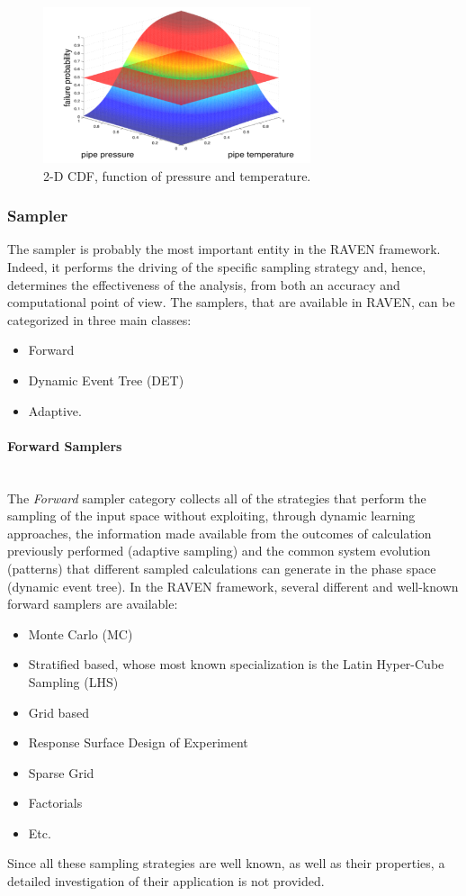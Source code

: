 \begin{figure}
  \centering
  \includegraphics[width=0.7\textwidth]  {pics/NDimensionalDistributionExample.png}
  \caption{2-D CDF, function of pressure and temperature.}
  \label{fig:NDDistributionExample}
\end{figure}

\subsubsection{Sampler}
\label{susub:OverviewSamplers}
The sampler is probably the most important entity in the RAVEN framework. Indeed, it performs the driving of the specific sampling strategy and, hence, determines the effectiveness of the analysis, from both an accuracy and computational point of view.  The samplers, that are available in RAVEN, can be categorized in three main classes:
\begin{itemize}
 \item Forward
 \item Dynamic Event Tree (DET)
 \item Adaptive.
\end{itemize}
\paragraph{Forward Samplers} ~\\
The \textit{Forward} sampler category collects all of the strategies that perform the sampling of the input space without exploiting, through dynamic learning approaches, the information made available from the outcomes of calculation previously performed (adaptive sampling) and the common system evolution (patterns) that different sampled calculations can generate in the phase space (dynamic event tree).
In the RAVEN framework, several different and well-known forward samplers are available:
\begin{itemize}
\item Monte Carlo (MC)
\item Stratified based, whose most known specialization is the Latin Hyper-Cube Sampling (LHS)
\item Grid based
\item Response Surface Design of Experiment
\item Sparse Grid
\item Factorials
\item Etc.
\end{itemize}
Since all these sampling strategies are well known, as well as their properties, a detailed investigation of their application is not provided.
